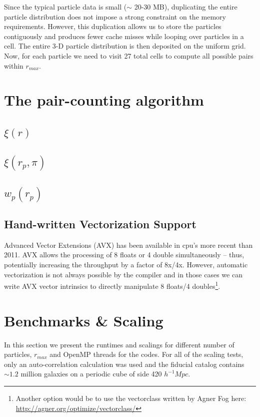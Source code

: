 \documentclass[preprint,authoryear,12pt]{elsarticle}
\newcommand{\hMpc}{\ensuremath{{h^{-1}Mpc}\xspace}}
\newcommand{\rmax}{\ensuremath{{r_{max}}}\xspace}
\newcommand{\xir}{\ensuremath{{\xi(r)}}\xspace}
\newcommand{\wprp}{\ensuremath{{w_p(r_p)}}\xspace}
\newcommand{\xirppi}{\ensuremath{{\xi(r_p,\pi)}}\xspace}
\begin{document}
Since the typical particle data is small ($\sim$ 20-30 MB), duplicating the entire particle distribution does not impose a strong 
constraint on the memory requirements. However, this duplication allows us to store the particles contiguously and produces fewer 
cache misses while looping over particles in a cell. 
The entire 3-D particle distribution is then deposited on the uniform grid. Now, for each particle we need to visit 27 total cells to 
compute all possible pairs within \rmax. 

\section{The pair-counting algorithm}

\subsection{\xir}
\subsection{\xirppi}
\subsection{\wprp}

\subsection{Hand-written Vectorization Support}
Advanced Vector Extensions (AVX) has been available in cpu's more recent than 2011. AVX allows the processing of 8 floats or 4 double simultaneously -- thus, 
potentially increasing the throughput by a factor of 8x/4x. However, automatic vectorization is not always possible by the compiler and in those cases 
we can write AVX vector intrinsics to directly manipulate 8 floats/4 doubles\footnote{Another option would be to use the vectorclass written by Agner Fog here: \url{http://agner.org/optimize/vectorclass/}}. 


\section{Benchmarks \& Scaling}
In this section we present the runtimes and scalings for different number of particles, \rmax and OpenMP threads for the codes. 
For all of the scaling tests, only an auto-correlation calculation was used and the fiducial catalog contains $\sim 1.2$ million 
galaxies on a periodic cube of side 420 \hMpc. 
\end{document}
